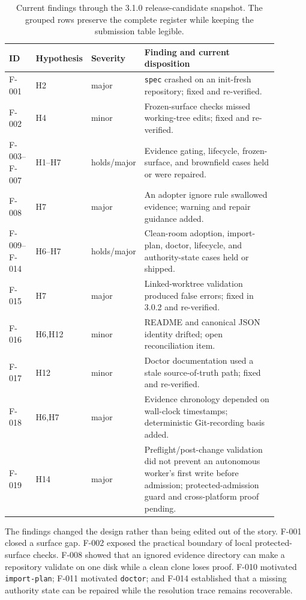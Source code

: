 \documentclass[11pt]{article}
\begin{document}
\begin{table}[t]
\centering
\small
\begin{tabular}{p{0.10\linewidth}p{0.11\linewidth}p{0.16\linewidth}p{0.52\linewidth}}
\toprule
ID & Hypothesis & Severity & Finding and current disposition \\
\midrule
F-001 & H2 & major & \texttt{spec} crashed on an init-fresh repository; fixed and re-verified. \\
F-002 & H4 & minor & Frozen-surface checks missed working-tree edits; fixed and re-verified. \\
F-003--F-007 & H1--H7 & holds/major & Evidence gating, lifecycle, frozen-surface, and brownfield cases held or were repaired. \\
F-008 & H7 & major & An adopter ignore rule swallowed evidence; warning and repair guidance added. \\
F-009--F-014 & H6--H7 & holds/major & Clean-room adoption, import-plan, doctor, lifecycle, and authority-state cases held or shipped. \\
F-015 & H7 & major & Linked-worktree validation produced false errors; fixed in 3.0.2 and re-verified. \\
F-016 & H6,H12 & minor & README and canonical JSON identity drifted; open reconciliation item. \\
F-017 & H12 & minor & Doctor documentation used a stale source-of-truth path; fixed and re-verified. \\
F-018 & H6,H7 & major & Evidence chronology depended on wall-clock timestamps; deterministic Git-recording basis added. \\
F-019 & H14 & major & Preflight/post-change validation did not prevent an autonomous worker's first write before admission; protected-admission guard and cross-platform proof pending. \\
\bottomrule
\end{tabular}
\caption{Current findings through the 3.1.0 release-candidate snapshot. The grouped rows
preserve the complete register while keeping the submission table legible.}
\label{tab:findings}
\end{table}

The findings changed the design rather than being edited out of the story. F-001 closed a
surface gap. F-002 exposed the practical boundary of local protected-surface checks. F-008
showed that an ignored evidence directory can make a repository validate on one disk while
a clean clone loses proof. F-010 motivated \texttt{import-plan}; F-011 motivated
\texttt{doctor}; and F-014 established that a missing authority state can be repaired while
the resolution trace remains recoverable.
\end{document}
